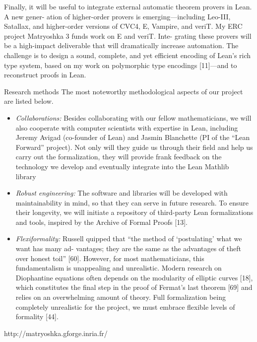 \documentclass[12pt]{amsart}  %
\begin{document}
Finally, it will be useful to integrate external automatic theorem provers in Lean. A new gener-
ation of higher-order provers is emerging—including Leo-III, Satallax, and higher-order versions
of CVC4, E, Vampire, and veriT. My ERC project Matryoshka 3 funds work on E and veriT. Inte-
grating these provers will be a high-impact deliverable that will dramatically increase automation.
The challenge is to design a sound, complete, and yet efficient encoding of Lean’s rich type system,
based on my work on polymorphic type encodings [11]—and to reconstruct proofs in Lean.

Research methods The most noteworthy methodological aspects of our project are listed below.
\begin{itemize}
\item \textsl{Collaborations:} Besides collaborating with our fellow mathematicians,
we will also cooperate with computer scientists with expertise in Lean, including
Jeremy Avigad (co-founder of Lean) and Jasmin Blanchette (PI of the ``Lean Forward'' project).
Not only will they guide us through their field and help us carry out the formalization, 
they will provide frank feedback on the technology we develop and eventually integrate 
into the Lean Mathlib library~\cite{}
\item \textsl{Robust engineering:} The software and libraries will be developed with maintainability in mind,
so that they can serve in future research. To ensure their longevity, we will initiate a repository
of third-party Lean formalizations and tools, inspired by the Archive of Formal Proofs [13].
\item \textsl{Flexiformality:} Russell quipped that “the method of ‘postulating’ what we want has many ad-
vantages; they are the same as the advantages of theft over honest toil” [60]. However, for
most mathematicians, this fundamentalism is unappealing and unrealistic. Modern research
on Diophantine equations often depends on the modularity of elliptic curves [18], which constitutes the final step in the proof of Fermat’s last theorem [69] and relies on an overwhelming
amount of theory. Full formalization being completely unrealistic for the project, we must embrace flexible levels of formality [44].
\end{itemize}
http://matryoshka.gforge.inria.fr/


\end{document}
